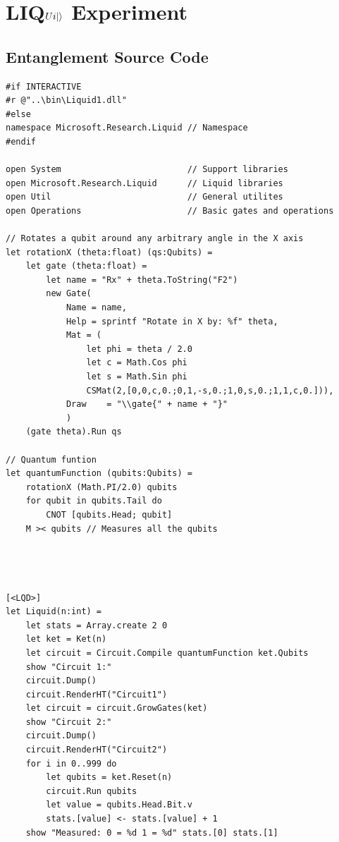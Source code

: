 \documentclass[12pt]{third-rep}
\begin{document}
\chapter{LIQ$Ui{\left\vert{}\right\rangle}$ Experiment}

\section{Entanglement Source Code}
\begin{verbatim}
#if INTERACTIVE
#r @"..\bin\Liquid1.dll"                 
#else
namespace Microsoft.Research.Liquid // Namespace
#endif

open System                         // Support libraries
open Microsoft.Research.Liquid      // Liquid libraries
open Util                           // General utilites
open Operations                     // Basic gates and operations

// Rotates a qubit around any arbitrary angle in the X axis 
let rotationX (theta:float) (qs:Qubits) =
    let gate (theta:float) =
        let name = "Rx" + theta.ToString("F2")
        new Gate(
            Name = name,
            Help = sprintf "Rotate in X by: %f" theta,
            Mat = (
                let phi = theta / 2.0
                let c = Math.Cos phi
                let s = Math.Sin phi
                CSMat(2,[0,0,c,0.;0,1,-s,0.;1,0,s,0.;1,1,c,0.])),
            Draw    = "\\gate{" + name + "}"
            )
    (gate theta).Run qs
    
// Quantum funtion
let quantumFunction (qubits:Qubits) =
    rotationX (Math.PI/2.0) qubits
    for qubit in qubits.Tail do 
        CNOT [qubits.Head; qubit]
    M >< qubits // Measures all the qubits




[<LQD>]
let Liquid(n:int) =
    let stats = Array.create 2 0
    let ket = Ket(n)
    let circuit = Circuit.Compile quantumFunction ket.Qubits
    show "Circuit 1:"
    circuit.Dump()
    circuit.RenderHT("Circuit1")
    let circuit = circuit.GrowGates(ket)
    show "Circuit 2:"
    circuit.Dump()
    circuit.RenderHT("Circuit2")
    for i in 0..999 do
        let qubits = ket.Reset(n) 
        circuit.Run qubits
        let value = qubits.Head.Bit.v
        stats.[value] <- stats.[value] + 1
    show "Measured: 0 = %d 1 = %d" stats.[0] stats.[1]
\end{verbatim}
\end{document}
